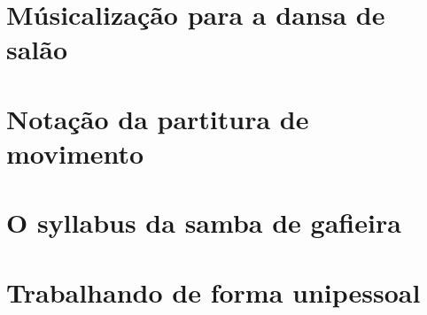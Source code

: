 \documentclass[11pt,fleqn]{book} %
\begin{document}
\part{Músicalização para a dansa de salão}





\part{Notação da partitura de movimento}




\part{O syllabus da samba de gafieira}






\part{Trabalhando de forma unipessoal}

\end{document}
